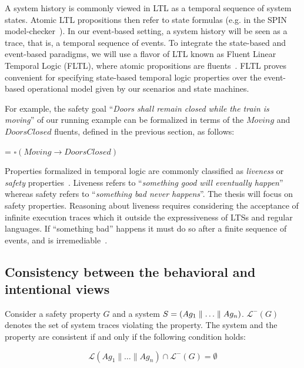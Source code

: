A system history is commonly viewed in LTL as a temporal sequence of system states. Atomic LTL propositions then refer to state formulas (e.g. in the SPIN model-checker~\cite{Holzmann:1997}). In our event-based setting, a system history will be seen as a trace, that is, a temporal sequence of events. To integrate the state-based and event-based paradigms, we will use a flavor of LTL known as Fluent Linear Temporal Logic (FLTL), where atomic propositions are fluents~\cite{Giannakopoulou:2003}. FLTL proves convenient for specifying state-based temporal logic properties over the event-based operational model given by our scenarios and state machines. 

For example, the safety goal ``\emph{Doors shall remain closed while the train is moving}'' of our running example can be formalized in terms of the $Moving$ and $DoorsClosed$ fluents, defined in the previous section, as follows:

\begin{center}
 = $\square(Moving \rightarrow DoorsClosed)$
\end{center}

Properties formalized in temporal logic are commonly classified as \emph{liveness} or \emph{safety} properties~\cite{Alpern:1986}. Liveness refers to ``\emph{something good will eventually happen}'' whereas safety refers to  ``\emph{something bad never happens}''. The thesis will focus on safety properties. Reasoning about liveness requires considering the acceptance of infinite execution traces which it outside the expressiveness of LTSs and regular languages. If ``something bad'' happens it must do so after a finite sequence of events, and is irremediable~\cite{Alpern:1986, Giannakopoulou:1999}.

\subsection{Consistency between the behavioral and intentional views\label{subsection:background-goals-consistency}}

Consider a safety property $G$ and a system $S = (Ag_1 \parallel \ldots \parallel Ag_n)$. $\mathcal{L}^{-}(G)$ denotes the set of system traces violating the property. The system and the property are consistent if and only if the following condition holds:

\begin{equation}
\mathcal{L}(Ag_1 \parallel \ldots \parallel Ag_n) \cap \mathcal{L}^{-}(G) = \emptyset
\label{equation:state-machines-and-goals-consistency}
\end{equation}

